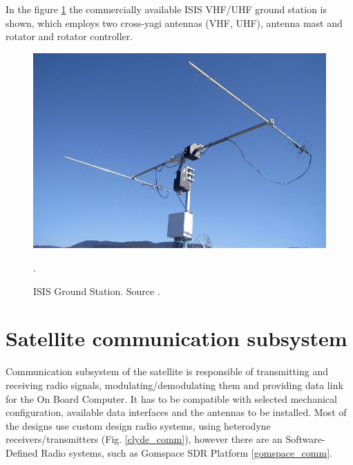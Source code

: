 In the figure \ref{isis_gs} the commercially available ISIS VHF/UHF ground station is shown, which employs two cross-yagi antennas (VHF, UHF), antenna mast and rotator and rotator controller.

\begin{figure}[H]
    \centering
    \includegraphics[width=0.5\paperwidth]{img/1/isis_gs.jpg}
    \caption{ISIS Ground Station. Source \cite{isis_gs}.}.
    \label{isis_gs}
\end{figure}

\section{Satellite communication subsystem}
Communication subsystem of the satellite is responsible of transmitting and receiving radio signals, modulating/demodulating them and providing data link for the On Board Computer. It has to be compatible with selected mechanical configuration, available data interfaces and the antennas to be installed. Most of the designs use custom design radio systems, using heterodyne receivers/transmitters (Fig. \ref{clyde_comm}), however there are an Software-Defined Radio systems, such as Gomspace SDR Platform \ref{gomspace_comm}.

